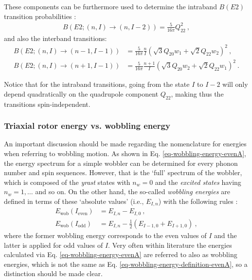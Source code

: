 These components can be furthermore used to determine the intraband $B(E2)$ transition probabilities \cite{wen2015wobbling}:
\begin{align}
    B(E2;(n,I)\to(n,I-2))=\frac{5}{16\pi}Q_{22}^2\ ,
    \label{intraband-probability-simple-wobbler}
\end{align}
and also the interband transitions:
\begin{align}
    B(E2;(n,I)\to(n-1,I-1))&=\frac{5}{16\pi}\frac{n}{I}\left(\sqrt{3}Q_{20}w_1+\sqrt{2}Q_{22}w_2\right)^2\ ,\\
    B(E2;(n,I)\to(n+1,I-1))&=\frac{5}{16\pi}\frac{n+1}{I}\left(\sqrt{3}Q_{20}w_2+\sqrt{2}Q_{22}w_1\right)^2\ .
    \label{interband-probability-simple-wobbler}
\end{align}

Notice that for the intraband transitions, going from the state $I$ to $I-2$ will only depend quadratically on the quadrupole component $Q_{22}$, making thus the transitions spin-independent.

\subsubsection*{Triaxial rotor energy vs. wobbling energy}

An important discussion should be made regarding the nomenclature for energies when referring to wobbling motion. As shown in Eq. \ref{eq-wobbling-energy-evenA}, the energy spectrum for a simple wobbler can be determined for every phonon number and spin sequences. However, that is the `full' spectrum  of the wobbler, which is composed of the \emph{yrast} states with $n_w=0$ and the \emph{excited states} having $n_w=1,\dots$ and so on. On the other hand, the so-called \emph{wobbling energies} are defined in terms of these `absolute values' (i.e., $E_{I,n}$) with the following rules \cite{wen2015wobbling}:
\begin{align}
    E_\text{wob}(I_\text{even})&=E_{I,n}-E_{I,0}\ ,\\
    E_\text{wob}(I_\text{odd})&=E_{I,n}-\frac{1}{2}\left(E_{I-1,0}+E_{I+1,0}\right)\ ,
    \label{eq-wobbling-energy-definition-evenA}
\end{align}
where the former wobbling energy corresponds to the even values of $I$ and the latter is applied for odd values of $I$. Very often within literature the energies calculated via Eq. \ref{eq-wobbling-energy-evenA} are referred to also as wobbling energies, which is not the same as Eq. \ref{eq-wobbling-energy-definition-evenA}, so a distinction should be made clear.

